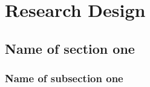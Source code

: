 \chapter{Research Design}

\lipsum[4]

\section{Name of section one}

\lipsum

\subsection{Name of subsection one}

\lipsum
